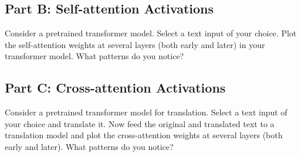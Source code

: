\documentclass{article}
\begin{document}
\subsection*{Part B: Self-attention Activations}

Consider a pretrained transformer model.
Select a text input of your choice.
Plot the self-attention weights at several layers (both early and later) in your transformer model.
What patterns do you notice?

\subsection*{Part C: Cross-attention Activations}

Consider a pretrained transformer model for translation.
Select a text input of your choice and translate it.
Now feed the original and translated text to a translation model and plot the cross-attention weights at several layers (both early and later). 
What patterns do you notice?

%
\end{document}
